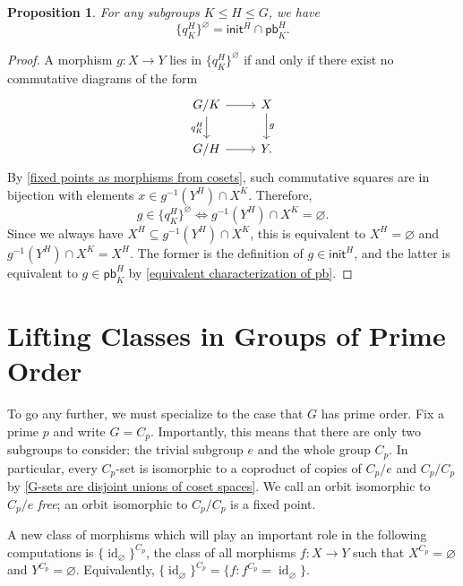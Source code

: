 \documentclass{amsart}
\renewcommand\emptyset\varnothing
\newcommand{\init}{\mathsf{init}}
\newcommand{\pb}{\mathsf{pb}}
\DeclareMathOperator{\id}{id}
\numberwithin{equation}{section}
\newtheorem{proposition}[equation]{Proposition}
\theoremstyle{definition}
\begin{document}
\begin{proposition}
	\label{vacuous lifting of quotients}
	For any subgroups $K \leq H \leq G$, we have
	\[
		\{q^H_K\}^\emptyset = \init^H \cap \pb^H_K.
	\]
\end{proposition}
\begin{proof}
	A morphism $g \colon X \to Y$ lies in $\{q^H_K\}^{\emptyset}$ if and only if there exist no commutative diagrams of the form 
	\[
		\begin{tikzcd}
			G/K \ar[r] \ar[d, "q^H_K"'] & X \ar[d, "g"] \\
			G/H \ar[r] & Y.
		\end{tikzcd}
	\]
	By \cref{fixed points as morphisms from cosets}, such commutative squares are in bijection with elements $x \in g^{-1}(Y^H) \cap X^K$. Therefore,
		\[g \in \{q^H_K\}^\emptyset \iff g^{-1}(Y^H) \cap X^K = \emptyset.\]
		Since we always have $X^H \subseteq g^{-1}(Y^H) \cap X^K$, this is equivalent to $X^H = \emptyset$ and $g^{-1}(Y^H) \cap X^K = X^H$. The former is the definition of $g \in \init^H$, and the latter is equivalent to $g \in \pb^H_K$ by \eqref{equivalent characterization of pb}.
\end{proof}


\section{Lifting Classes in Groups of Prime Order}
\label{section: Cp-sets}

To go any further, we must specialize to the case that $G$ has prime order. Fix a prime $p$ and write $G = C_p$. Importantly, this means that there are only two subgroups to consider: the trivial subgroup $e$ and the whole group $C_p$. In particular, every $C_p$-set is isomorphic to a coproduct of copies of $C_p/e$ and $C_p/C_p$ by \cref{G-sets are disjoint unions of coset spaces}. We call an orbit isomorphic to $C_p/e$ \emph{free}; an orbit isomorphic to $C_p/C_p$ is a fixed point.

A new class of morphisms which will play an important role in the following computations is $\{\id_\emptyset\}^{C_p}$, the class of all morphisms $f : X \to Y$ such that $X^{C_p} = \emptyset$ and $Y^{C_p} = \emptyset$. Equivalently, $\{\id_\emptyset\}^{C_p} = \{f : f^{C_p} = \id_\emptyset\}$.
\end{document}
